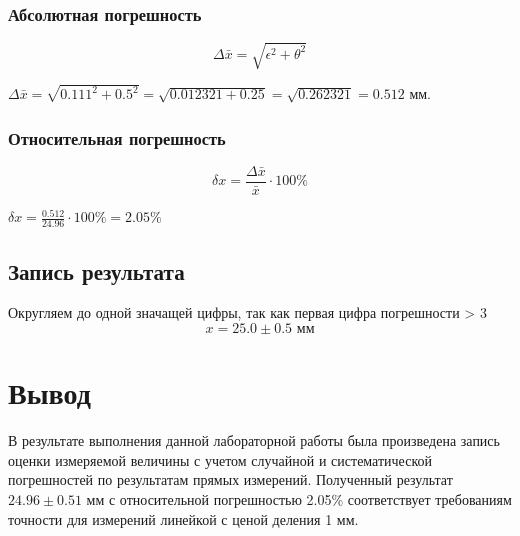 \documentclass[12pt, a4paper]{article}
\begin{document}
	\subsubsection*{Абсолютная погрешность}
	
	$$\Delta \bar{x} = \sqrt{\epsilon^2 + \theta^2}$$
	
	$\Delta \bar{x} = \sqrt{0.111^2 + 0.5^2} = \sqrt{0.012321 + 0.25} = \sqrt{0.262321} = 0.512$ мм.
	
	\subsubsection*{Относительная погрешность}
	
	$$\delta x = \frac{\Delta \bar{x}}{\bar{x}} \cdot 100\%$$
	
	$\delta x = \frac{0.512}{24.96} \cdot 100\% = 2.05\%$
	
	\subsection*{Запись результата}
	
	Округляем до одной значащей цифры, так как первая цифра погрешности > 3
	$$x = 25.0 \pm 0.5 \text{ мм}$$
	
	\section*{Вывод}
	
	В результате выполнения данной лабораторной работы была произведена
	запись оценки измеряемой величины с учетом случайной и систематической
	погрешностей по результатам прямых измерений. Полученный результат
	$24.96 \pm 0.51$ мм с относительной погрешностью 2.05\% соответствует
	требованиям точности для измерений линейкой с ценой деления 1 мм.
	
\end{document}
